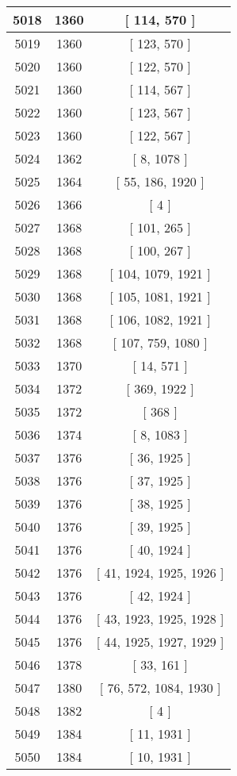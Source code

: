 \begin{center}
\begin{longtable}[H]{|| c c c ||}
\hline
5018 & 1360 & [ 114, 570 ] \\ 
\hline
5019 & 1360 & [ 123, 570 ] \\ 
\hline
5020 & 1360 & [ 122, 570 ] \\ 
\hline
5021 & 1360 & [ 114, 567 ] \\ 
\hline
5022 & 1360 & [ 123, 567 ] \\ 
\hline
5023 & 1360 & [ 122, 567 ] \\ 
\hline
5024 & 1362 & [ 8, 1078 ] \\ 
\hline
5025 & 1364 & [ 55, 186, 1920 ] \\ 
\hline
5026 & 1366 & [ 4 ] \\ 
\hline
5027 & 1368 & [ 101, 265 ] \\ 
\hline
5028 & 1368 & [ 100, 267 ] \\ 
\hline
5029 & 1368 & [ 104, 1079, 1921 ] \\ 
\hline
5030 & 1368 & [ 105, 1081, 1921 ] \\ 
\hline
5031 & 1368 & [ 106, 1082, 1921 ] \\ 
\hline
5032 & 1368 & [ 107, 759, 1080 ] \\ 
\hline
5033 & 1370 & [ 14, 571 ] \\ 
\hline
5034 & 1372 & [ 369, 1922 ] \\ 
\hline
5035 & 1372 & [ 368 ] \\ 
\hline
5036 & 1374 & [ 8, 1083 ] \\ 
\hline
5037 & 1376 & [ 36, 1925 ] \\ 
\hline
5038 & 1376 & [ 37, 1925 ] \\ 
\hline
5039 & 1376 & [ 38, 1925 ] \\ 
\hline
5040 & 1376 & [ 39, 1925 ] \\ 
\hline
5041 & 1376 & [ 40, 1924 ] \\ 
\hline
5042 & 1376 & [ 41, 1924, 1925, 1926 ] \\ 
\hline
5043 & 1376 & [ 42, 1924 ] \\ 
\hline
5044 & 1376 & [ 43, 1923, 1925, 1928 ] \\ 
\hline
5045 & 1376 & [ 44, 1925, 1927, 1929 ] \\ 
\hline
5046 & 1378 & [ 33, 161 ] \\ 
\hline
5047 & 1380 & [ 76, 572, 1084, 1930 ] \\ 
\hline
5048 & 1382 & [ 4 ] \\ 
\hline
5049 & 1384 & [ 11, 1931 ] \\ 
\hline
5050 & 1384 & [ 10, 1931 ] \\ 

\end{longtable}
\end{center}
